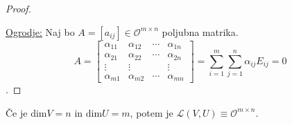 \documentclass[a4paper,12pt]{article}
\begin{document}
\begin{proof}
\begin{center}
	 \end{center}

	 \underline{Ogrodje:} Naj bo $A=[a_{ij}]\in \mathcal{O}^{m\times n}$ poljubna matrika. \\

	 $$A = \begin{bmatrix}
		\alpha_{11} & \alpha_{12} & \cdots & \alpha_{1n} \\
		\alpha_{21} & \alpha_{22} & \cdots & \alpha_{2n} \\
		\vdots & \vdots & & \vdots \\
		\alpha_{m1} & \alpha_{m2} & \cdots & \alpha_{mn}
	 \end{bmatrix} = \sum_{i=1}^m \sum_{j=1}^n \alpha_{ij}E_{ij}=0$$. 
\end{proof}

Če je dim$V=n$ in dim$U=m$, potem je $\mathcal{L}(V,U)\equiv \mathcal{O}^{m\times n}$. \\
\end{document}
